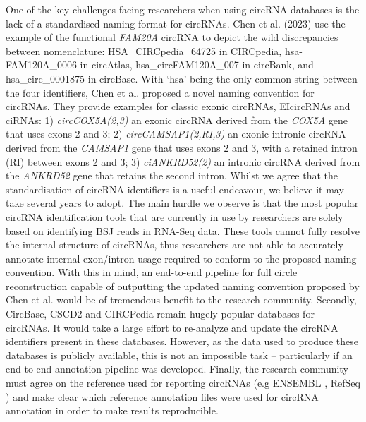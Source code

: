 \documentclass[journal,review,submit,pdftex,moreauthors]{Definitions/mdpi}
\begin{document}
One of the key challenges facing researchers when using circRNA databases is the lack of a standardised naming format for circRNAs. Chen et al. (2023) \cite{Chen2023Jan} use the example of the functional \textit{FAM20A} circRNA to depict the wild discrepancies between nomenclature: HSA\_CIRCpedia\_64725 in CIRCpedia, hsa-FAM120A\_0006 in circAtlas, hsa\_circFAM120A\_007 in circBank, and hsa\_circ\_0001875 in circBase. With `hsa' being the only common string between the four identifiers, Chen et al. proposed a novel naming convention for circRNAs. They provide examples for classic exonic circRNAs, EIcircRNAs and ciRNAs: 1) \textit{circCOX5A(2,3)} an exonic circRNA derived from the \textit{COX5A} gene that uses exons 2 and 3; 2) \textit{circCAMSAP1(2,RI,3)} an exonic-intronic circRNA derived from the \textit{CAMSAP1} gene that uses exons 2 and 3, with a retained intron (RI) between exons 2 and 3; 3) \textit{ciANKRD52(2)} an intronic circRNA derived from the \textit{ANKRD52} gene that retains the second intron. Whilst we agree that the standardisation of circRNA identifiers is a useful endeavour, we believe it may take several years to adopt. The main hurdle we observe is that the most popular circRNA identification tools that are currently in use by researchers are solely based on identifying BSJ reads in RNA-Seq data. These tools cannot fully resolve the internal structure of circRNAs, thus researchers are not able to accurately annotate internal exon/intron usage required to conform to the proposed naming convention. With this in mind, an end-to-end pipeline for full circle reconstruction capable of outputting the updated naming convention proposed by Chen et al. would be of tremendous benefit to the research community. Secondly, CircBase, CSCD2 and CIRCPedia remain hugely popular databases for circRNAs. It would take a large effort to re-analyze and update the circRNA identifiers present in these databases. However, as the data used to produce these databases is publicly available, this is not an impossible task -- particularly if an end-to-end annotation pipeline was developed. Finally, the research community must agree on the reference used for reporting circRNAs (e.g ENSEMBL \cite{ENSEMBL2023}, RefSeq \cite{RefSeq}) and make clear which reference annotation files were used for circRNA annotation in order to make results reproducible.
\end{document}
